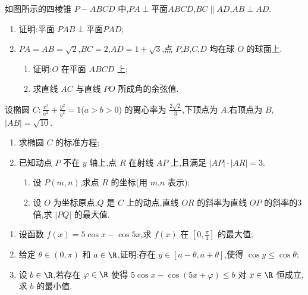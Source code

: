 \begin{problem}
如图所示的四棱锥 \(P - ABCD\) 中,\(PA \perp \text{平面} ABCD\),\(BC \parallel AD\),\(AB \perp AD\).

\begin{enumerate}
\item 证明:平面 \(PAB \perp \text{平面} PAD\);
\item \(PA = AB = \sqrt{2}\),\(BC = 2\),\(AD = 1 + \sqrt{3}\),点 \(P\),\(B\),\(C\),\(D\) 均在球 \(O\) 的球面上.
\begin{enumerate}
\item 证明:\(O\) 在平面 \(ABCD\) 上;
\item 求直线 \(AC\) 与直线 \(PO\) 所成角的余弦值.
\end{enumerate}
\end{enumerate}

\end{problem}

\begin{problem}
设椭圆 \(C: \frac{x^2}{a^2} + \frac{y^2}{b^2} = 1\)(\(a > b > 0\)) 的离心率为 \(\frac{2\sqrt{2}}{3}\),下顶点为 \(A\),右顶点为 \(B\),\(|AB| = \sqrt{10}\).

\begin{enumerate}
\item 求椭圆 \(C\) 的标准方程;
\item 已知动点 \(P\) 不在 \(y\) 轴上,点 \(R\) 在射线 \(AP\) 上,且满足 \(|AP| \cdot |AR| = 3\).
\begin{enumerate}
\item 设 \(P(m, n)\),求点 \(R\) 的坐标(用 \(m\),\(n\) 表示);
\item 设 \(O\) 为坐标原点,\(Q\) 是 \(C\) 上的动点,直线 \(OR\) 的斜率为直线 \(OP\) 的斜率的3倍,求 \(|PQ|\) 的最大值.
\end{enumerate}
\end{enumerate}
\end{problem}

\begin{problem}

\begin{enumerate}
\item 设函数 \(f(x) = 5\cos x - \cos 5x\),求 \(f(x)\) 在 \(\left[0, \frac{\pi}{4}\right]\) 的最大值;
\item 给定 \(\theta \in (0,\pi)\) 和 \(a \in \R\),证明:存在 \(y \in [a - \theta, a + \theta]\),使得 \(\cos y \le \cos \theta\);
\item 设 \(b \in \R\),若存在 \(\varphi \in \R\) 使得 \(5\cos x - \cos (5x + \varphi) \le b\) 对 \(x \in \R\) 恒成立,求 \(b\) 的最小值.
\end{enumerate}
\end{problem}

